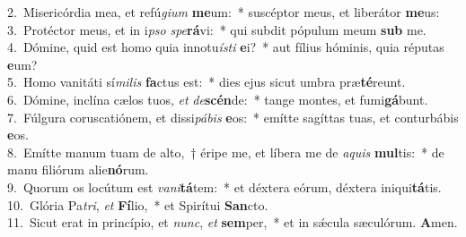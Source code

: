 {2.~}Misericórdia mea, et refú\textit{gi}\textit{um} \textbf{me}um:~* suscéptor meus, et liberátor \textbf{me}us:\\
{3.~}Protéctor meus, et in i\textit{pso} \textit{spe}\textbf{rá}vi:~* qui subdit pópulum meum \textbf{sub} me.\\
{4.~}Dómine, quid est homo quia innotu\textit{í}\textit{sti} \textbf{e}i?~* aut fílius hóminis, quia réputas \textbf{e}um?\\
{5.~}Homo vanitáti sí\textit{mi}\textit{lis} \textbf{fa}ctus est:~* dies ejus sicut umbra præ\textbf{té}reunt.\\
{6.~}Dómine, inclína cælos tuos, \textit{et} \textit{de}\textbf{scén}de:~* tange montes, et fumi\textbf{gá}bunt.\\
{7.~}Fúlgura coruscatiónem, et dissi\textit{pá}\textit{bis} \textbf{e}os:~* emítte sagíttas tuas, et conturbábis \textbf{e}os.\\
{8.~}Emítte manum tuam de alto,~† éripe me, et líbera me de \textit{a}\textit{quis} \textbf{mul}tis:~* de manu filiórum alie\textbf{nó}rum.\\
{9.~}Quorum os locútum est \textit{va}\textit{ni}\textbf{tá}tem:~* et déxtera eórum, déxtera iniqui\textbf{tá}tis.\\
{10.~}Glória Pa\textit{tri}, \textit{et} \textbf{Fí}lio,~* et Spirítui \textbf{San}cto.\\
{11.~}Sicut erat in princípio, et \textit{nunc}, \textit{et} \textbf{sem}per,~* et in sǽcula sæculórum. \textbf{A}men.\\
